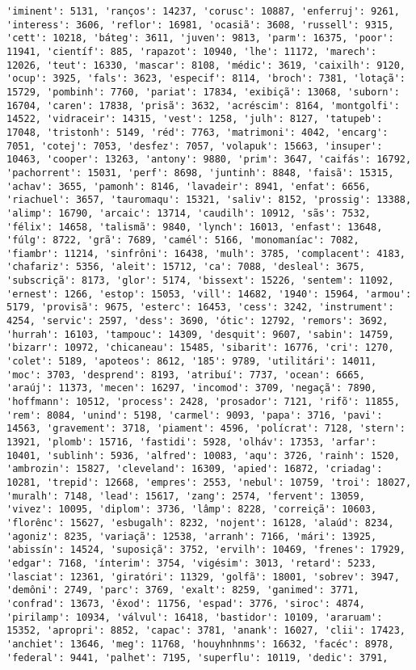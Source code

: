 \documentclass[11pt]{article}
\begin{document}
\begin{Verbatim}[commandchars=\\\{\}]
'iminent': 5131, 'ranços': 14237, 'corusc': 10887, 'enferruj': 9261, 'interess': 3606, 'reflor': 16981, 'ocasiã': 3608, 'russell': 9315, 'cett': 10218, 'báteg': 3611, 'juven': 9813, 'parm': 16375, 'poor': 11941, 'científ': 885, 'rapazot': 10940, 'lhe': 11172, 'marech': 12026, 'teut': 16330, 'mascar': 8108, 'médic': 3619, 'caixilh': 9120, 'ocup': 3925, 'fals': 3623, 'especif': 8114, 'broch': 7381, 'lotaçã': 15729, 'pombinh': 7760, 'pariat': 17834, 'exibiçã': 13068, 'suborn': 16704, 'caren': 17838, 'prisã': 3632, 'acréscim': 8164, 'montgolfi': 14522, 'vidraceir': 14315, 'vest': 1258, 'julh': 8127, 'tatupeb': 17048, 'tristonh': 5149, 'réd': 7763, 'matrimoni': 4042, 'encarg': 7051, 'cotej': 7053, 'desfez': 7057, 'volapuk': 15663, 'insuper': 10463, 'cooper': 13263, 'antony': 9880, 'prim': 3647, 'caifás': 16792, 'pachorrent': 15031, 'perf': 8698, 'juntinh': 8848, 'faisã': 15315, 'achav': 3655, 'pamonh': 8146, 'lavadeir': 8941, 'enfat': 6656, 'riachuel': 3657, 'tauromaqu': 15321, 'saliv': 8152, 'prossig': 13388, 'alimp': 16790, 'arcaic': 13714, 'caudilh': 10912, 'sãs': 7532, 'félix': 14658, 'talismã': 9840, 'lynch': 16013, 'enfast': 13648, 'fúlg': 8722, 'grã': 7689, 'camél': 5166, 'monomaníac': 7082, 'fiambr': 11214, 'sinfrôni': 16438, 'mulh': 3785, 'complacent': 4183, 'chafariz': 5356, 'aleit': 15712, 'ca': 7088, 'desleal': 3675, 'subscriçã': 8173, 'glor': 5174, 'bissext': 15226, 'sentem': 11092, 'ernest': 1266, 'estop': 15053, 'vill': 14682, '1940': 15964, 'armou': 5179, 'provisã': 9675, 'esterc': 16453, 'cess': 3242, 'instrument': 4254, 'servic': 2597, 'dess': 3690, 'ótic': 12792, 'remors': 3692, 'hurrah': 16103, 'tampouc': 14309, 'desquit': 9607, 'sabin': 14759, 'bizarr': 10972, 'chicaneau': 15485, 'sibarit': 16776, 'cri': 1270, 'colet': 5189, 'apoteos': 8612, '185': 9789, 'utilitári': 14011, 'moc': 3703, 'desprend': 8193, 'atribuí': 7737, 'ocean': 6665, 'araúj': 11373, 'mecen': 16297, 'incomod': 3709, 'negaçã': 7890, 'hoffmann': 10512, 'process': 2428, 'prosador': 7121, 'rifõ': 11855, 'rem': 8084, 'unind': 5198, 'carmel': 9093, 'papa': 3716, 'pavi': 14563, 'gravement': 3718, 'piament': 4596, 'polícrat': 7128, 'stern': 13921, 'plomb': 15716, 'fastidi': 5928, 'olháv': 17353, 'arfar': 10401, 'sublinh': 5936, 'alfred': 10083, 'aqu': 3726, 'rainh': 1520, 'ambrozin': 15827, 'cleveland': 16309, 'apied': 16872, 'criadag': 10281, 'trepid': 12668, 'empres': 2553, 'nebul': 10759, 'troi': 18027, 'muralh': 7148, 'lead': 15617, 'zang': 2574, 'fervent': 13059, 'vivez': 10095, 'diplom': 3736, 'lâmp': 8228, 'correiçã': 10603, 'florênc': 15627, 'esbugalh': 8232, 'nojent': 16128, 'alaúd': 8234, 'agoniz': 8235, 'variaçã': 12538, 'arranh': 7166, 'mári': 13925, 'abissín': 14524, 'suposiçã': 3752, 'ervilh': 10469, 'frenes': 17929, 'edgar': 7168, 'ínterim': 3754, 'vigésim': 3013, 'retard': 5233, 'lasciat': 12361, 'giratóri': 11329, 'golfã': 18001, 'sobrev': 3947, 'demôni': 2749, 'parc': 3769, 'exalt': 8259, 'ganimed': 3771, 'confrad': 13673, 'êxod': 11756, 'espad': 3776, 'siroc': 4874, 'pirilamp': 10934, 'válvul': 16418, 'bastidor': 10109, 'araruam': 15352, 'apropri': 8852, 'capac': 3781, 'anank': 16027, 'clii': 17423, 'anchiet': 13646, 'meg': 11768, 'houyhnhnms': 16632, 'facéc': 8978, 'federal': 9441, 'palhet': 7195, 'superflu': 10119, 'dedic': 3791, 
\end{Verbatim}
\end{document}
